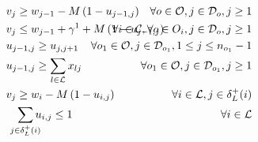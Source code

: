 \documentclass{article}
\begin{document}
\begin{alignat}{3}
    \label{mod:c16}        & v_{j} \geq w_{j-1} - M\left(1- u_{j-1,j}\right)                                                                                                                                                                                                                                                  & \hspace{-20mm}  \forall o \in \mathcal{O}, j \in \mathcal{D}_{o}, j \geq 1                       \\
    \label{mod:c17}        & v_{j}  \leq  w_{j-1} + \gamma^1 + M\left(1- u_{j-1,j}\right)                                                                                                                                                                                                                                     & \hspace{-20mm} \forall i \in \mathcal{C}, \forall o \in O_i, j \in \mathcal{D}_{o}, j \geq 1     \\
    \label{mod:c18}        & u_{j-1,j} \geq u_{j,j+1}                                                                                                                                                                                                                                                                         & \hspace{-35mm} \forall o_1 \in\mathcal{O},  j \in \mathcal{D}_{o_1}, 1 \leq j \leq n_{o_{1}}-1   \\
    \label{mod:c19}        & u_{j-1,j} \geq \sum_{l \in \mathcal{L}}{x_{lj}}                                                                                                                                                                                                                                                  & \hspace{-20mm}  \forall o_1 \in \mathcal{O}, j \in \mathcal{D}_{o_1}, j \geq 1                   \\
    \label{mod:c20}        & v_{j} \geq w_{i} - M\left(1- u_{i,j}\right)                                                                                                                                                                                                                                                      & \hspace{-20mm}  \forall i \in \mathcal{L}, j \in \delta^{+}_{L}(i)                               \\
    \label{mod:c21}        & \hspace{3mm} \smashoperator{ \sum_{ j \in \delta^{+}_{L}(i)}}{u_{i,j } } \leq 1                                                                                                                                                                                                                  & \hspace{-20mm}  \forall i \in \mathcal{L}                                                        \\

\end{alignat}
\end{document}
